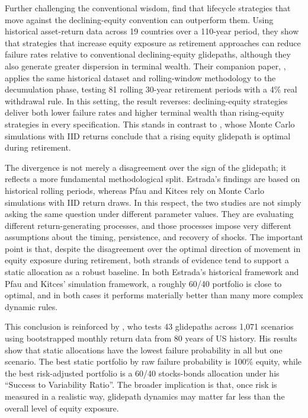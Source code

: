 \documentclass[11pt]{article}
\begin{document}
Further challenging the conventional wisdom, \textcite{estrada2014glidepath} find that lifecycle strategies that move against the declining-equity convention can outperform them. Using historical asset-return data across 19 countries over a 110-year period, they show that strategies that increase equity exposure as retirement approaches can reduce failure rates relative to conventional declining-equity glidepaths, although they also generate greater dispersion in terminal wealth. Their companion paper, \textcite{estrada2015retirement}, applies the same historical dataset and rolling-window methodology to the decumulation phase, testing 81 rolling 30-year retirement periods with a 4\% real withdrawal rule. In this setting, the result reverses: declining-equity strategies deliver both lower failure rates and higher terminal wealth than rising-equity strategies in every specification. This stands in contrast to \textcite{pfau2014rising}, whose Monte Carlo simulations with IID returns conclude that a rising equity glidepath is optimal during retirement.

The divergence is not merely a disagreement over the sign of the glidepath; it reflects a more fundamental methodological split. Estrada's findings are based on historical rolling periods, whereas Pfau and Kitces rely on Monte Carlo simulations with IID return draws. In this respect, the two studies are not simply asking the same question under different parameter values. They are evaluating different return-generating processes, and those processes impose very different assumptions about the timing, persistence, and recovery of shocks. The important point is that, despite the disagreement over the optimal direction of movement in equity exposure during retirement, both strands of evidence tend to support a static allocation as a robust baseline. In both Estrada's historical framework and Pfau and Kitces' simulation framework, a roughly 60/40 portfolio is close to optimal, and in both cases it performs materially better than many more complex dynamic rules.

This conclusion is reinforced by \textcite{blanchett2007dynamic}, who tests 43 glidepaths across 1,071 scenarios using bootstrapped monthly return data from 80 years of US history. His results show that static allocations have the lowest failure probability in all but one scenario. The best static portfolio by raw failure probability is 100\% equity, while the best risk-adjusted portfolio is a 60/40 stocks-bonds allocation under his ``Success to Variability Ratio''. The broader implication is that, once risk is measured in a realistic way, glidepath dynamics may matter far less than the overall level of equity exposure.
\end{document}
